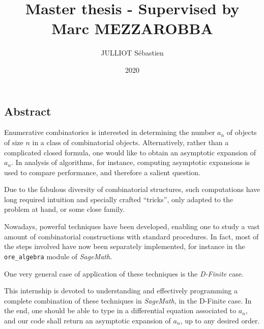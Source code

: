 \documentclass[a4paper, 12pt]{report}
\author{JULLIOT Sébastien}
\date{2020}
\title{Master thesis -	Supervised by Marc MEZZAROBBA}
\begin{document}


\clearpage
\vspace*{\fill}
\begin{center}
	\begin{minipage}{.8\textwidth}
		\begin{center}{\section*{Abstract}}\end{center}
		Enumerative combinatorics is interested in determining the number $a_n$ of objects of size $n$ in a class of combinatorial objects. Alternatively, rather than a complicated closed formula, one would like to obtain an asymptotic expansion of $a_n$. In analysis of algorithms, for instance, computing asymptotic expansions is used to compare performance, and therefore a salient question.

		Due to the fabulous diversity of combinatorial structures, such computations have long required intuition and specially crafted ``tricks'', only adapted to the problem at hand, or some close family.

		Nowadays, powerful techniques have been developed, enabling one to study a vast amount of combinatorial constructions with standard procedures. In fact, most of the steps involved have now been separately implemented, for instance in the \verb|ore_algebra| module of \textit{SageMath}.

		One very general case of application of these techniques is the \textit{D-Finite} case.

		This internship is devoted to understanding and effectively programming a complete combination of these techniques in \textit{SageMath}, in the D-Finite case.
		In the end, one should be able to type in a differential equation associated to $a_n$, and our code shall return an asymptotic expansion of $a_n$, up to any desired order.
	\end{minipage}
\end{center}
\vfill %
\clearpage

\tableofcontents



\printbibliography
\end{document}
